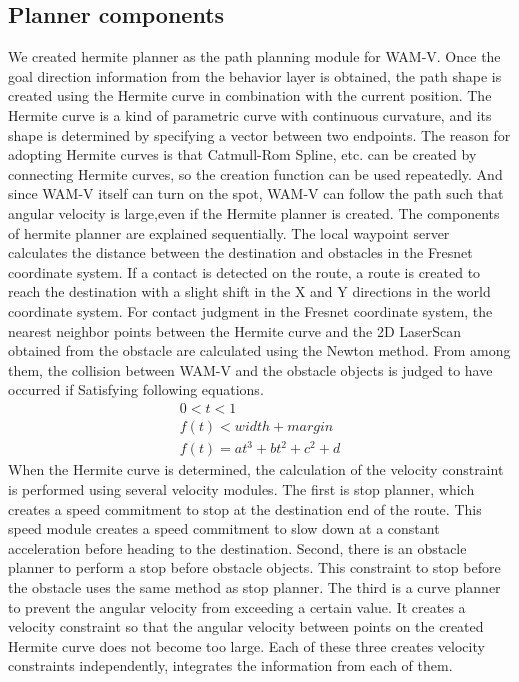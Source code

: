 \documentclass[lettersize,journal]{IEEEtran}
\begin{document}
\subsection{Planner components}
We created hermite planner as the path planning module for WAM-V.
Once the goal direction information from the behavior layer is obtained, the path shape is created using the Hermite curve in combination with the current position.
The Hermite curve is a kind of parametric curve with continuous curvature, and its shape is determined by specifying a vector between two endpoints.
The reason for adopting Hermite curves is that Catmull-Rom Spline, etc. can be created by connecting Hermite curves, so the creation function can be used repeatedly.
And since WAM-V itself can turn on the spot, WAM-V can follow the path such that angular velocity is large,even if the Hermite planner is created.
\indent The components of hermite planner are explained sequentially.
The local waypoint server calculates the distance between the destination and obstacles in the Fresnet coordinate system.
If a contact is detected on the route, a route is created to reach the destination with a slight shift in the X and Y directions in the world coordinate system.
For contact judgment in the Fresnet coordinate system, the nearest neighbor points between the Hermite curve and the 2D LaserScan obtained from the obstacle are calculated using the Newton method.
From among them, the collision between WAM-V and the obstacle objects is judged to have occurred if Satisfying following equations.
\begin{eqnarray}
  0<t<1\\
  f(t)<width+margin\\
  f(t)=at^3+bt^2+c^2+d
  \end{eqnarray}
When the Hermite curve is determined, the calculation of the velocity constraint is performed using several velocity modules.
The first is stop planner, which creates a speed commitment to stop at the destination end of the route.
This speed module creates a speed commitment to slow down at a constant acceleration before heading to the destination.
Second, there is an obstacle planner to perform a stop before obstacle objects.
This constraint to stop before the obstacle uses the same method as stop planner.
The third is a curve planner to prevent the angular velocity from exceeding a certain value.
It creates a velocity constraint so that the angular velocity between points on the created Hermite curve does not become too large.
Each of these three creates velocity constraints independently, integrates the information from each of them.
\end{document}
